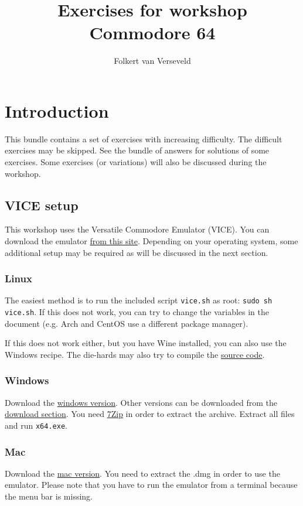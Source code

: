 \documentclass{article}
\title{Exercises for workshop Commodore 64}
\author{Folkert van Verseveld}
\newcounter{solution}
\begin{document}
\maketitle

\section{Introduction}

This bundle contains a set of exercises with increasing difficulty.
The difficult exercises may be skipped.
See the bundle of answers for solutions of some exercises.
Some exercises (or variations) will also be discussed during the workshop.

\subsection{VICE setup}
This workshop uses the Versatile Commodore Emulator (VICE).
You can download the emulator \href{http://vice-emu.sourceforge.net/}{from this site}.
Depending on your operating system, some additional setup may be required as will be discussed in the next section.

\subsubsection{Linux}
The easiest method is to run the included script \verb:vice.sh: as root:
\verb:sudo sh vice.sh:.
If this does not work, you can try to change the variables in the document (e.g. Arch and CentOS use a different package manager).

If this does not work either, but you have Wine installed, you can also use the Windows recipe.
The die-hards may also try to compile the \href{http://sourceforge.net/projects/vice-emu/files/releases/vice-3.1.tar.gz/download}{source code}.

\subsubsection{Windows}
Download the \href{http://sourceforge.net/projects/vice-emu/files/releases/binaries/windows/WinVICE-3.1-x64.7z/download}{windows version}.
Other versions can be downloaded from the \href{http://vice-emu.sourceforge.net/windows.html}{download section}.
You need \href{http://www.7-zip.org/}{7Zip} in order to extract the archive.
Extract all files and run \verb:x64.exe:.

\subsubsection{Mac}
Download the \href{http://sourceforge.net/projects/vice-emu/files/releases/binaries/macosx/vice-macosx-sdl-x86_64-10.12-3.1.dmg/download}{mac version}.
You need to extract the .dmg in order to use the emulator.
Please note that you have to run the emulator from a terminal because the menu bar is missing.
\end{document}
